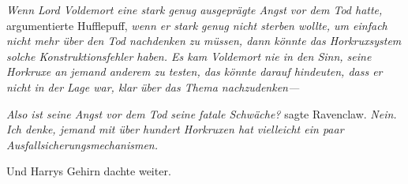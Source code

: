 \emph{\hfill\break Wenn Lord Voldemort eine stark genug ausgeprägte Angst vor dem Tod hatte,} argumentierte Hufflepuff, \emph{wenn er stark genug nicht sterben wollte, um einfach nicht mehr über den Tod nachdenken zu müssen, dann könnte das Horkruxsystem solche Konstruktionsfehler haben. Es kam Voldemort nie in den Sinn, seine Horkruxe an jemand anderem zu testen, das könnte darauf hindeuten, dass er nicht in der Lage war, klar über das Thema nachzudenken—}

\emph{Also ist seine Angst vor dem Tod seine fatale Schwäche?} sagte Ravenclaw. \emph{Nein. Ich denke, jemand mit über hundert Horkruxen hat vielleicht ein paar Ausfallsicherungsmechanismen.}

Und Harrys Gehirn dachte weiter.

